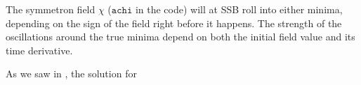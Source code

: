 

\newcommand{\brphi}{\breve{\phi}}
\newcommand{\brchi}{\breve{\chi}}





The symmetron field $\chi$ ($\mathtt{achi}$ in the code) will at SSB roll into either minima, depending on the sign of the field right before it happens. The strength of the oscillations around the true minima depend on both the initial field value and its time derivative. 

As we saw in , the solution for 



